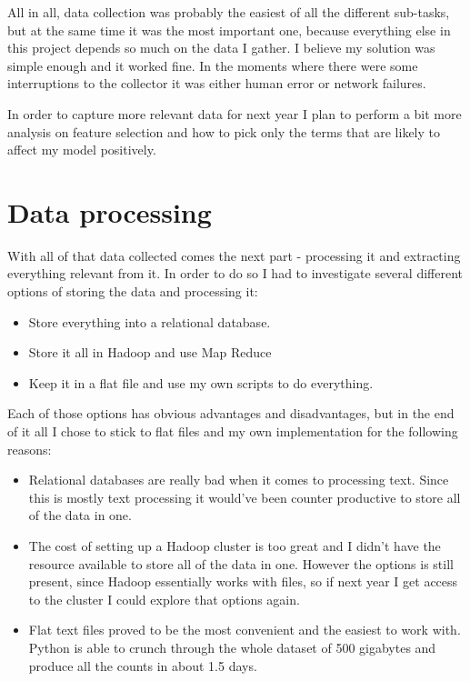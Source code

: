 \documentclass[minf,frontabs,twoside,singlespacing,parskip]{infthesis}
\begin{document}
All in all, data collection was probably the easiest of all the different sub-tasks, but at the same time it was the most important one, because everything else in this project depends so much on the data I gather. I believe my solution was simple enough and it worked fine. In the moments where there were some interruptions to the collector it was either human error or network failures. 


In order to capture more relevant data for next year I plan to perform a bit more analysis on feature selection and how to pick only the terms that are likely to affect my model positively. 


\section{Data processing}
\label{sec:dp}


With all of that data collected comes the next part - processing it and extracting everything relevant from it. In order to do so I had to investigate several different options of storing the data and processing it:
\begin{itemize}
\item Store everything into a relational database.
\item Store it all in Hadoop and use Map Reduce
\item Keep it in a flat file and use my own scripts to do everything.
\end{itemize}


Each of those options has obvious advantages and disadvantages, but in the end of it all I chose to stick to flat files and my own implementation for the following reasons:
\begin{itemize}
\item Relational databases are really bad when it comes to processing text. Since this is mostly text processing it would've been counter productive to store all of the data in one. 
\item The cost of setting up a Hadoop cluster is too great and I didn't have the resource available to store all of the data in one. However the options is still present, since Hadoop essentially works with files, so if next year I get access to the cluster I could explore that options again. 
\item Flat text files proved to be the most convenient and the easiest to work with. Python is able to crunch through the whole dataset of 500 gigabytes and produce all the counts in about 1.5 days.
\end{itemize}
\end{document}
